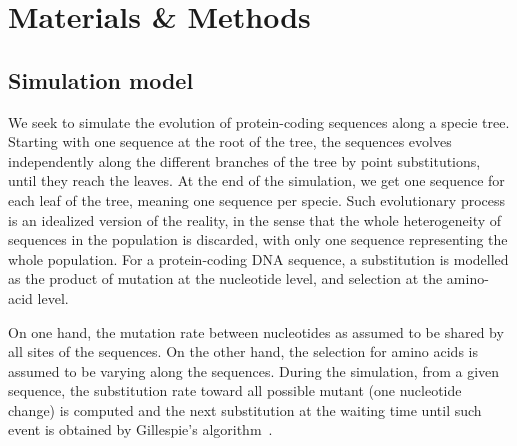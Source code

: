 \section{Materials \& Methods}

\subsection{Simulation model}
\label{sec:mut-bias-simu}
We seek to simulate the evolution of protein-coding sequences along a specie tree.
Starting with one sequence at the root of the tree, the sequences evolves independently along the different branches of the tree by point substitutions, until they reach the leaves.
At the end of the simulation, we get one sequence for each leaf of the tree, meaning one sequence per specie.
Such evolutionary process is an idealized version of the reality, in the sense that the whole heterogeneity of sequences in the population is discarded, with only one sequence representing the whole population.
For a protein-coding \acrshort{DNA} sequence, a substitution is modelled as the product of mutation at the nucleotide level, and selection at the amino-acid level.

On one hand, the mutation rate between nucleotides as assumed to be shared by all sites of the sequences.
On the other hand, the selection for amino acids is assumed to be varying along the sequences.
During the simulation, from a given sequence, the substitution rate toward all possible mutant (one nucleotide change) is computed and the next substitution at the waiting time until such event is obtained by Gillespie's algorithm~\citep{Gillespie1977}.

